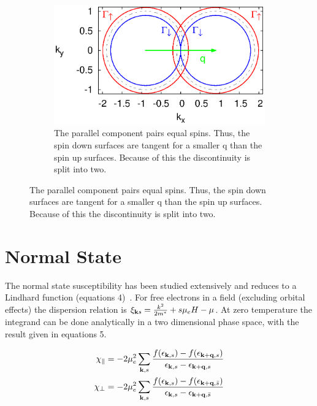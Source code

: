 \documentclass[usletter,aps,prb,10pt,amssymb,amsmath,twocolumn]{revtex4-1}
\begin{document}
\begin{figure}
\begin{subfigure}[b]{0.23\textwidth}
                \includegraphics[width=\textwidth]{./figures/SpinPairingzz.eps}
                \caption{The parallel component pairs equal spins. Thus, the spin down surfaces are tangent for a smaller q than the spin up surfaces. Because of this the discontinuity is split into two.}
        \end{subfigure}
 \end{figure}
 
\section{Normal State}
The normal state susceptibility has been studied extensively and reduces to a Lindhard function (equations 4)~\cite{mahan}. For free electrons in a field (excluding orbital effects) the dispersion relation is $\xi_{{\bf k}s}=\frac{k^2}{2m^*}+s\mu_e H-\mu$. At zero temperature the integrand can be done analytically in a two dimensional phase space, with the result given in equations 5. 

\begin{subequations}
\begin{align}
\chi_{\parallel}=-2\mu_e^2\sum\limits_{{\bf k},s} \frac{ f(\epsilon_{{\bf k},s})-f(\epsilon_{{\bf k+q},s})}{ \epsilon_{{\bf k},s}-\epsilon_{{\bf k+q},s}} \\
\chi_{\perp}=-2\mu_e^2\sum\limits_{{\bf k},s} \frac{ f(\epsilon_{{\bf k},s})-f(\epsilon_{{\bf k+q},\bar{s}})}{ \epsilon_{{\bf k},s}-\epsilon_{{\bf k+q},\bar{s}}}
\end{align}
\end{subequations}
\end{document}
